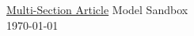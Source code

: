 \documentclass[12pt,english]{article}
\begin{document}
\begingroup
  \centering
  \LARGE \href{https://fanwangecon.github.io/Tex4Econ/#5-multi-section-article}{Multi-Section Article} Model Sandbox \\
  \large \today \par
\endgroup


% 
% 


\end{document}
